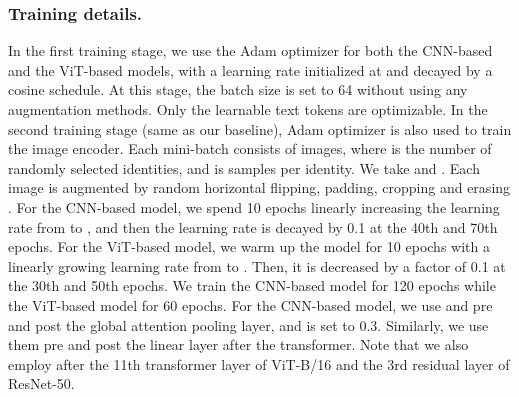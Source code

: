 \documentclass[letterpaper]{article} \usepackage{aaai23}  \usepackage{times}  \usepackage{helvet}  \usepackage{courier}  \usepackage[hyphens]{url}  \usepackage{graphicx} \urlstyle{rm} \def\UrlFont{\rm}  \usepackage{natbib}  \usepackage{caption} \frenchspacing  \setlength{\pdfpagewidth}{8.5in}  \setlength{\pdfpageheight}{11in}  \usepackage{algorithm}
\begin{document}
\subsubsection{Training details.} In the first training stage, we use the Adam optimizer for both the CNN-based and the ViT-based models, with a learning rate initialized at  and decayed by a cosine schedule. At this stage, the batch size is set to 64 without using any augmentation methods. Only the learnable text tokens  are optimizable. In the second training stage (same as our baseline), Adam optimizer is also used to train the image encoder. Each mini-batch consists of  images, where  is the number of randomly selected identities, and  is samples per identity. We take  and . Each image is augmented by random horizontal flipping, padding, cropping and erasing \cite{randomerasing}. For the CNN-based model, we spend 10 epochs linearly increasing the learning rate from  to , and then the learning rate is decayed by 0.1 at the 40th and 70th epochs. For the ViT-based model, we warm up the model for 10 epochs with a linearly growing learning rate from  to . Then, it is decreased by a factor of 0.1 at the 30th and 50th epochs. We train the CNN-based model for 120 epochs while the ViT-based model for 60 epochs. For the CNN-based model, we use  and  pre and post the global attention pooling layer, and  is set to 0.3. Similarly, we use them pre and post the linear layer after the transformer. Note that we also employ   after the 11th transformer layer of ViT-B/16 and the 3rd residual layer of ResNet-50. 
\end{document}
